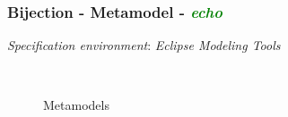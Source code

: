 \documentclass{beamer}
\begin{document}
\begin{frame}
\frametitle{Bijection - \textbf{Metamodel} - \textbf{\textit{\textcolor{green}{echo}}}}

\textit{Specification environment}: \textit{ Eclipse Modeling Tools}

\begin{figure}[ht]
    \centering
    \mbox{\qquad\qquad
          }
    \caption{Metamodels}
    \label{fig:Meta}
\end{figure}

\end{frame}
\end{document}
